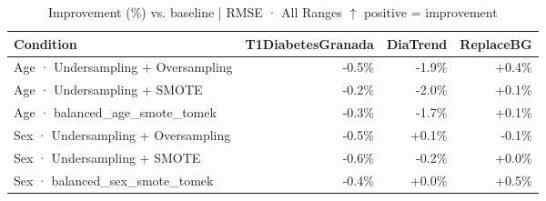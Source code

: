 \begin{table}[htbp]
\centering
\small
\caption{Improvement (\%) vs. baseline  |  RMSE · All Ranges  $\uparrow$ positive = improvement}
\label{tab:delta_rmse_entire_family_size_same_size}
\begin{tabular}{lrrr}
\toprule
\textbf{Condition} & \textbf{T1DiabetesGranada} & \textbf{DiaTrend} & \textbf{ReplaceBG} \\
\midrule
Age · Undersampling + Oversampling & \textcolor{BrickRed}{-0.5\%} & \textcolor{BrickRed}{-1.9\%} & \textcolor{OliveGreen}{+0.4\%} \\
Age · Undersampling + SMOTE & \textcolor{BrickRed}{-0.2\%} & \textcolor{BrickRed}{-2.0\%} & \textcolor{OliveGreen}{+0.1\%} \\
Age · balanced_age_smote_tomek & \textcolor{BrickRed}{-0.3\%} & \textcolor{BrickRed}{-1.7\%} & \textcolor{OliveGreen}{+0.1\%} \\
\midrule
Sex · Undersampling + Oversampling & \textcolor{BrickRed}{-0.5\%} & \textcolor{OliveGreen}{+0.1\%} & \textcolor{BrickRed}{-0.1\%} \\
Sex · Undersampling + SMOTE & \textcolor{BrickRed}{-0.6\%} & \textcolor{BrickRed}{-0.2\%} & \textcolor{OliveGreen}{+0.0\%} \\
Sex · balanced_sex_smote_tomek & \textcolor{BrickRed}{-0.4\%} & \textcolor{OliveGreen}{+0.0\%} & \textcolor{OliveGreen}{+0.5\%} \\
\bottomrule
\end{tabular}
\end{table}